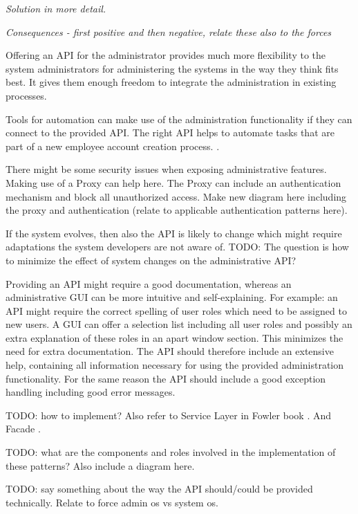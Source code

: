 \textit{Solution in more detail.}

\textit{Consequences - first positive and then negative, relate these also to the forces}

Offering an API for the administrator provides much more flexibility to the system administrators for administering the systems in the way they think fits best. It gives them enough freedom to integrate the administration in existing processes.

Tools for automation can make use of the administration functionality if they can connect to the provided API. The right API helps to automate tasks that are part of a new employee account creation process. \cite{Limoncelli2011a}.

There might be some security issues when exposing administrative features. Making use of a {\sc Proxy} \cite{Gamma95} can help here. The {\sc Proxy} can include an authentication mechanism and block all unauthorized access. Make new diagram here including the proxy and authentication (relate to applicable authentication patterns here).

If the system evolves, then also the API is likely to change which might require adaptations the system developers are not aware of. TODO: The question is how to minimize the effect of system changes on the administrative API?

Providing an API might require a good documentation, whereas an administrative GUI can be more intuitive and self-explaining. For example: an API might require the correct spelling of user roles which need to be assigned to new users. A GUI can offer a selection list including all user roles and possibly an extra explanation of these roles in an apart window section. This minimizes the need for extra documentation. The API should therefore include an extensive help, containing all information necessary for using the provided administration functionality. For the same reason the API should include a good exception handling including good error messages. 


TODO: how to implement? Also refer to {\sc Service Layer} in Fowler book \cite{Fowler:2002:PEA:579257}. And {\sc Facade} \cite{Gamma95}.  

TODO: what are the components and roles involved in the implementation of these patterns? Also include a diagram here.

TODO: say something about the way the API should/could be provided technically. Relate to force admin os vs system os.

